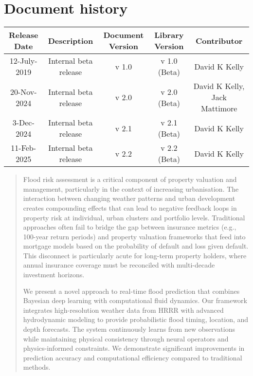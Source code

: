\documentclass{article}
\begin{document}
\section{Document history}
\begin{table}[ht]
\centering
\begin{tabular}{c|c|c|c|c}
Release Date & Description & Document Version & Library Version & Contributor\\
\hline
12-July-2019 & Internal beta release & v 1.0 & v 1.0 (Beta) & David K Kelly\\
20-Nov-2024 & Internal beta release & v 2.0 & v 2.0 (Beta) & David K Kelly,  Jack Mattimore\\
3-Dec-2024 & Internal beta release & v 2.1 & v 2.1 (Beta) & David K Kelly \\
11-Feb-2025 & Internal beta release & v 2.2 & v 2.2 (Beta) & David K Kelly

\end{tabular}
\label{tab:revision_history}
\end{table}

\clearpage
{}

\begin{abstract}
Flood risk assessment is a critical component of property valuation and management, particularly in the context of increasing urbanisation. The interaction between changing weather patterns and urban development creates compounding effects that can lead to negative feedback loops in property risk at individual, urban clusters and portfolio levels. Traditional approaches often fail to bridge the gap between insurance metrics (e.g., 100-year return periods) and property valuation frameworks that feed into mortgage models based on the probability of default and loss given default. This disconnect is particularly acute for long-term property holders, where annual insurance coverage must be reconciled with multi-decade investment horizons.

We present a novel approach to real-time flood prediction that combines Bayesian deep learning with computational fluid dynamics. Our framework integrates high-resolution weather data from HRRR with advanced hydrodynamic modeling to provide probabilistic flood timing, location, and depth forecasts. The system continuously learns from new observations while maintaining physical consistency through neural operators and physics-informed constraints. We demonstrate significant improvements in prediction accuracy and computational efficiency compared to traditional methods.
\end{abstract}
\end{document}
